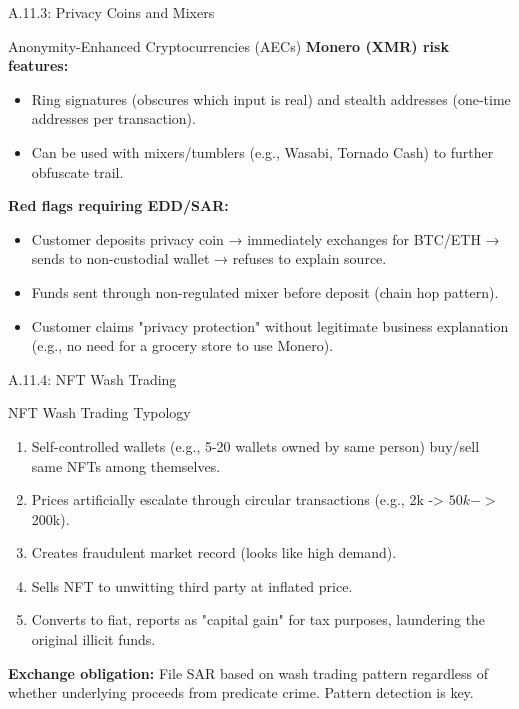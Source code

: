 \documentclass{beamer}
\begin{document}
	\begin{frame}{A.11.3: Privacy Coins and Mixers}
		\begin{block}{Anonymity-Enhanced Cryptocurrencies (AECs)}
			\textbf{Monero (XMR) risk features:}
			\begin{itemize}
				\item Ring signatures (obscures which input is real) and stealth addresses (one-time addresses per transaction).
				\item Can be used with mixers/tumblers (e.g., Wasabi, Tornado Cash) to further obfuscate trail.
			\end{itemize}
		\end{block}
		\textbf{Red flags requiring EDD/SAR:}
		\begin{itemize}
			\item Customer deposits privacy coin → immediately exchanges for BTC/ETH → sends to non-custodial wallet → refuses to explain source.
			\item Funds sent through non-regulated mixer before deposit (chain hop pattern).
			\item Customer claims "privacy protection" without legitimate business explanation (e.g., no need for a grocery store to use Monero).
		\end{itemize}
	\end{frame}
	
	\begin{frame}{A.11.4: NFT Wash Trading}
		\begin{block}{NFT Wash Trading Typology}
			\begin{enumerate}
				\item Self-controlled wallets (e.g., 5-20 wallets owned by same person) buy/sell same NFTs among themselves.
				\item Prices artificially escalate through circular transactions (e.g., 2k -> $50k -> $200k).
				\item Creates fraudulent market record (looks like high demand).
				\item Sells NFT to unwitting third party at inflated price.
				\item Converts to fiat, reports as "capital gain" for tax purposes, laundering the original illicit funds.
			\end{enumerate}
		\end{block}
		\textbf{Exchange obligation:} File SAR based on wash trading pattern regardless of whether underlying proceeds from predicate crime. Pattern detection is key.
	\end{frame}
	
\end{document}
